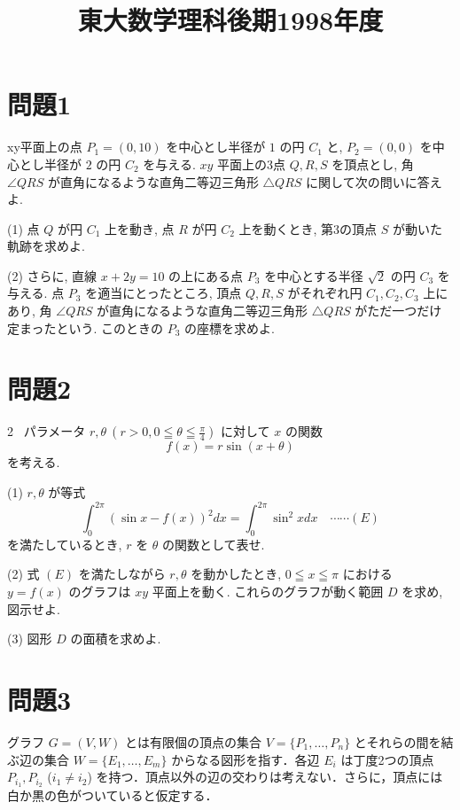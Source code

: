 \documentclass[unicode,12pt, A4j]{ltjsarticle}%
\title{東大数学理科後期1998年度}
\author{}
\date{}
\begin{document}
\maketitle

\section{問題1}

xy平面上の点 $P_1 = (0, 10)$ を中心とし半径が $1$ の円 $C_1$ と, $P_2 = (0, 0)$ を中心とし半径が $2$ の円 $C_2$ を与える. $xy$ 平面上の3点 $Q, R, S$ を頂点とし, 角 $\angle QRS$ が直角になるような直角二等辺三角形 $\triangle QRS$ に関して次の問いに答えよ.

(1) 点 $Q$ が円 $C_1$ 上を動き, 点 $R$ が円 $C_2$ 上を動くとき, 第3の頂点 $S$ が動いた軌跡を求めよ.

(2) さらに, 直線 $x + 2y = 10$ の上にある点 $P_3$ を中心とする半径 $\sqrt{2}$ の円 $C_3$ を与える. 点 $P_3$ を適当にとったところ, 頂点 $Q, R, S$ がそれぞれ円 $C_1, C_2, C_3$ 上にあり, 角 $\angle QRS$ が直角になるような直角二等辺三角形 $\triangle QRS$ がただ一つだけ定まったという. このときの $P_3$ の座標を求めよ.


\section{問題2}
2 \ パラメータ $r, \theta \ (r > 0, 0 \leqq \theta \leqq \frac{\pi}{4})$ に対して $x$ の関数
$$ f(x) = r \sin(x + \theta) $$
を考える.

(1) $r, \theta$ が等式
$$ \int_0^{2\pi} (\sin x - f(x))^2 dx = \int_0^{2\pi} \sin^2 x dx \quad \cdots\cdots (E) $$
を満たしているとき, $r$ を $\theta$ の関数として表せ.

(2) 式 $(E)$ を満たしながら $r, \theta$ を動かしたとき, $0 \leqq x \leqq \pi$ における $y = f(x)$ のグラフは $xy$ 平面上を動く. これらのグラフが動く範囲 $D$ を求め, 図示せよ.

(3) 図形 $D$ の面積を求めよ.



\section{問題3}
グラフ $G = (V, W)$ とは有限個の頂点の集合 $V = \{P_1, \dots, P_n\}$ とそれらの間を結ぶ辺の集合 $W = \{E_1, \dots, E_m\}$ からなる図形を指す．各辺 $E_i$ は丁度2つの頂点 $P_{i_1}, P_{i_2}$ ($i_1 \neq i_2$) を持つ．頂点以外の辺の交わりは考えない．さらに，頂点には白か黒の色がついていると仮定する．
\end{document}
